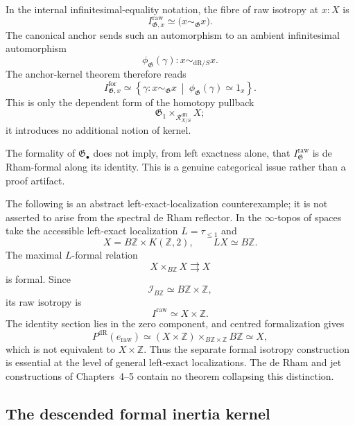 \begin{remark}
In the internal infinitesimal-equality notation, the fibre of raw isotropy at
$x:X$ is
\[
    I^{\mathrm{raw}}_{\mathfrak G,x}
    \simeq
    \bigl(x\sim_{\mathfrak G}x\bigr).
\]
The canonical anchor sends such an automorphism to an ambient infinitesimal
automorphism
\[
    \phi_{\mathfrak G}(\gamma):
    x\sim_{\mathrm{dR}/S}x.
\]
The anchor-kernel theorem therefore reads
\[
    I^{\mathrm{for}}_{\mathfrak G,x}
    \simeq
    \left\{
        \gamma:x\sim_{\mathfrak G}x
        \ \middle|\
        \phi_{\mathfrak G}(\gamma)\simeq 1_x
    \right\}.
\]
This is only the dependent form of the homotopy pullback
\[
    \mathfrak G_1\times_{\mathcal R^{\mathrm{dR}}_{X/S}}X;
\]
it introduces no additional notion of kernel.
\end{remark}

\begin{remark}
\label{rem:raw-formal-isotropy-distinct}
The formality of $\mathfrak G_\bullet$ does not imply, from left exactness
alone, that $I^{\mathrm{raw}}_{\mathfrak G}$ is de Rham-formal along its identity.
This is a genuine categorical issue rather than a proof artifact.

The following is an abstract left-exact-localization counterexample; it is not
asserted to arise from the spectral de Rham reflector.  In the
$\infty$-topos of spaces take the accessible left-exact localization
$L=\tau_{\le1}$ and
\[
    X=B\mathbb Z\times K(\mathbb Z,2),
    \qquad
    LX\simeq B\mathbb Z.
\]
The maximal $L$-formal relation
\[
    X\times_{B\mathbb Z}X\rightrightarrows X
\]
is formal.  Since
\[
    \mathcal I_{B\mathbb Z}
    \simeq
    B\mathbb Z\times\mathbb Z,
\]
its raw isotropy is
\[
    I^{\mathrm{raw}}
    \simeq
    X\times\mathbb Z.
\]
The identity section lies in the zero component, and centred formalization gives
\[
    P^{\mathrm{dR}}(e_{\mathrm{raw}})
    \simeq
    (X\times\mathbb Z)
    \times_{B\mathbb Z\times\mathbb Z}
    B\mathbb Z
    \simeq X,
\]
which is not equivalent to $X\times\mathbb Z$.  Thus the separate formal
isotropy construction is essential at the level of general left-exact
localizations.  The de Rham and jet constructions of Chapters~4--5 contain no theorem collapsing this
distinction.
\end{remark}

\subsection{The descended formal inertia kernel}

